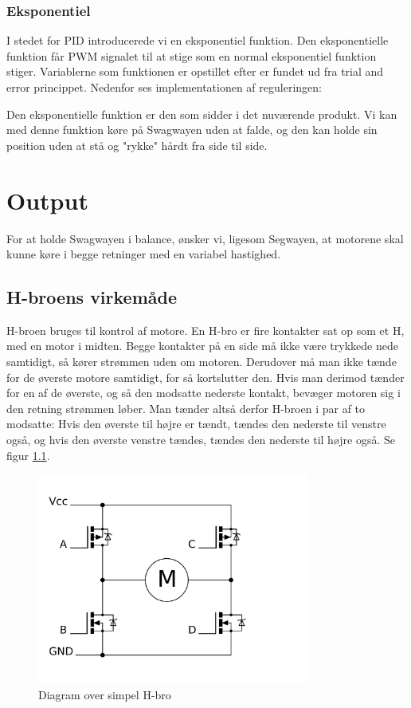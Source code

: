 \documentclass[a4paper,oneside,article,danish,table]{memoir}
\newcommand{\swino}[2]{}
\begin{document}
\subsection{Eksponentiel}
I stedet for PID introducerede vi en eksponentiel funktion. Den eksponentielle funktion får PWM signalet til at stige som en normal eksponentiel funktion stiger. Variablerne som funktionen er opstillet efter er fundet ud fra trial and error princippet. Nedenfor ses implementationen af reguleringen:
\swino{54}{58}

\swino{168}{180}

Den eksponentielle funktion er den som sidder i det nuværende produkt. Vi kan med denne funktion køre på Swagwayen uden at falde, og den kan holde sin position uden at stå og "rykke" hårdt fra side til side.
\chapter{Output}
For at holde Swagwayen i balance, ønsker vi, ligesom Segwayen, at motorene skal kunne køre i begge retninger med en variabel hastighed.
\section{H-broens virkemåde}
\label{sec:H-broen}
H-broen bruges til kontrol af motore. 
En H-bro er fire kontakter sat op som et H, med en motor i midten. Begge kontakter på en side må ikke være trykkede nede samtidigt, så kører strømmen uden om motoren. Derudover må man ikke tænde for de øverste motore samtidigt, for så kortslutter den. Hvis man derimod tænder for en af de øverste, og så den modsatte nederste kontakt, bevæger motoren sig i den retning strømmen løber. Man tænder altså derfor H-broen i par af to modsatte: Hvis den øverste til højre er tændt, tændes den nederste til venstre også, og hvis den øverste venstre tændes, tændes den nederste til højre også. Se figur \ref{fig:hbro}.
\begin{figure}[htbp]
  \centering
  \includegraphics[width=0.8\textwidth]{pictures/hbrigde.pdf}
  \caption{Diagram over simpel H-bro}
  \label{fig:hbro}
\end{figure}
\end{document}
